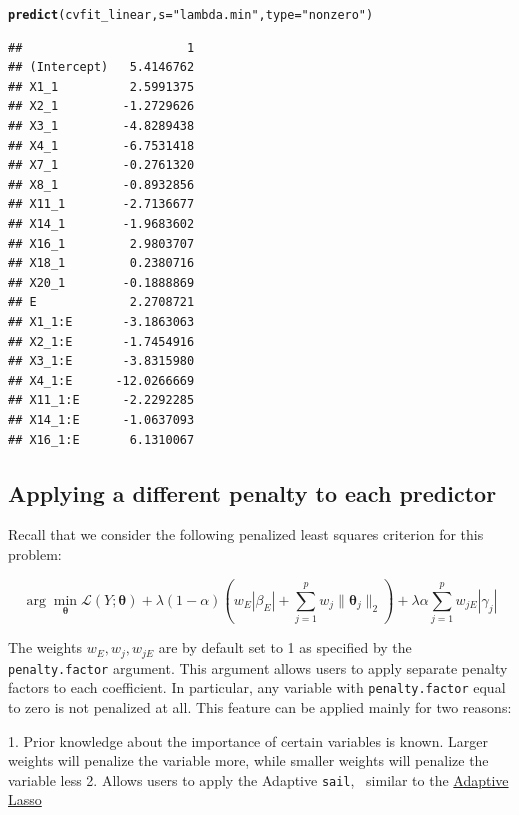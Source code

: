 \documentclass[12pt,letter]{article}\usepackage[]{graphicx}\usepackage[]{color}
\makeatletter
\newcommand{\hlstr}[1]{\textcolor[rgb]{0.192,0.494,0.8}{#1}}%
\newcommand{\hlstd}[1]{\textcolor[rgb]{0.345,0.345,0.345}{#1}}%
\newcommand{\hlkwc}[1]{\textcolor[rgb]{0.333,0.667,0.333}{#1}}%
\newcommand{\hlkwd}[1]{\textcolor[rgb]{0.737,0.353,0.396}{\textbf{#1}}}%
\newenvironment{kframe}{%
 \def\at@end@of@kframe{}%
 \ifinner\ifhmode%
  \def\at@end@of@kframe{\end{minipage}}%
  \begin{minipage}{\columnwidth}%
 \fi\fi%
 \def\FrameCommand##1{\hskip\@totalleftmargin \hskip-\fboxsep
 \colorbox{shadecolor}{##1}\hskip-\fboxsep
     \hskip-\linewidth \hskip-\@totalleftmargin \hskip\columnwidth}%
 \MakeFramed {\advance\hsize-\width
   \@totalleftmargin\z@ \linewidth\hsize
   \@setminipage}}%
 {\par\unskip\endMakeFramed%
 \at@end@of@kframe}
\newenvironment{knitrout}{}{} %
\newcommand{\sail}{\texttt{sail}}
\makeatother
\begin{document}
\begin{knitrout}\scriptsize
{}\color{fgcolor}\begin{kframe}
\begin{alltt}
\hlkwd{predict}\hlstd{(cvfit_linear,} \hlkwc{s} \hlstd{=} \hlstr{"lambda.min"}\hlstd{,} \hlkwc{type} \hlstd{=} \hlstr{"nonzero"}\hlstd{)}
\end{alltt}
\begin{verbatim}
##                       1
## (Intercept)   5.4146762
## X1_1          2.5991375
## X2_1         -1.2729626
## X3_1         -4.8289438
## X4_1         -6.7531418
## X7_1         -0.2761320
## X8_1         -0.8932856
## X11_1        -2.7136677
## X14_1        -1.9683602
## X16_1         2.9803707
## X18_1         0.2380716
## X20_1        -0.1888869
## E             2.2708721
## X1_1:E       -3.1863063
## X2_1:E       -1.7454916
## X3_1:E       -3.8315980
## X4_1:E      -12.0266669
## X11_1:E      -2.2292285
## X14_1:E      -1.0637093
## X16_1:E       6.1310067
\end{verbatim}
\end{kframe}
\end{knitrout}


\subsection{Applying a different penalty to each predictor} \label{ap:pfac}

Recall that we consider the following penalized least squares criterion for this problem:

\begin{equation}
\arg\min_{\boldsymbol{\theta} }  \mathcal{L}(Y;\boldsymbol{\theta}) + \lambda (1-\alpha)  \left( w_E |\beta_E| + \sum_{j=1}^{p} w_j \lVert\boldsymbol{\theta}_j \rVert_2 \right) +  \lambda\alpha \sum_{j=1}^{p} w_{jE} |\gamma_{j}|
\end{equation}

The weights $w_E, w_j, w_{jE}$ are by default set to 1 as specified by the \texttt{penalty.factor} argument. This argument allows users to apply separate penalty factors to each coefficient.  In particular, any variable with \texttt{penalty.factor} equal to zero is not penalized at all. This feature can be applied mainly for two reasons:

1. Prior knowledge about the importance of certain variables is known. Larger weights will penalize the variable more, while smaller weights will penalize the variable less
2. Allows users to apply the Adaptive \sail, ~similar to the \href{http://users.stat.umn.edu/~zouxx019/Papers/adalasso.pdf}{Adaptive Lasso}
\end{document}
